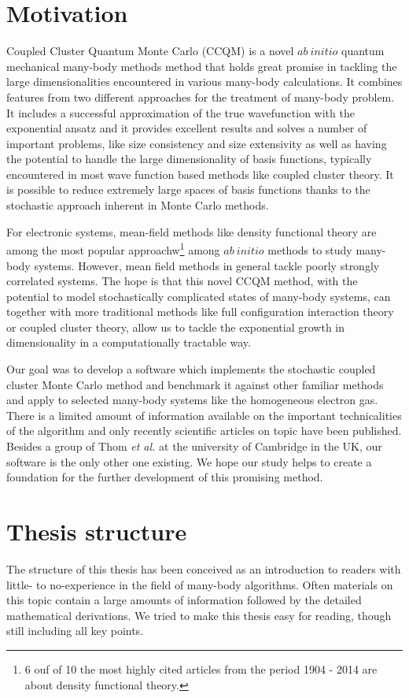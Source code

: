 \documentclass[twoside,english]{uiofysmaster}
\begin{document}
	\tableofcontents
	
\section{Motivation }
Coupled Cluster Quantum Monte Carlo (CCQM)  is a novel $ab\ initio$ quantum
mechanical many-body methods method that holds great promise in
tackling the large dimensionalities encountered in various many-body
calculations.  It combines features from two different approaches for
the treatment of many-body problem. It includes a successful
approximation of the true wavefunction with the exponential ansatz and it
provides excellent results and solves a number of important problems,
like size consistency and size extensivity as well as having the potential  to handle
the large dimensionality of basis functions, typically encountered in most wave function based methods like coupled cluster theory.
It is possible to reduce extremely large spaces of
basis functions thanks to the stochastic approach inherent  in Monte Carlo methods.

For electronic systems, mean-field methods like density functional
theory are among the most popular approachw\footnote{6 ouf of 10 the
	most highly cited articles from the period 1904 - 2014 are about
	density functional theory\cite{httpphysicsdatabasecom}.} among
$ab\ initio$ methods to study many-body systems. However, mean field
methods in general tackle poorly strongly correlated systems.  The
hope is that this novel CCQM method, with the potential to model
stochastically complicated states of many-body systems, can together
with more traditional methods like full configuration interaction
theory or coupled cluster theory, allow us to tackle the exponential
growth in dimensionality in a computationally tractable way.

Our goal was to develop a software which implements the stochastic
coupled cluster Monte Carlo method and benchmark it against other
familiar methods and apply to selected many-body systems like the
homogeneous electron gas. There is a limited amount of information
available on the important technicalities of the algorithm and only
recently scientific articles on topic have been published. Besides a
group of Thom {\em et al.} at the university of Cambridge in the UK, our software is the
only other one existing.  We hope our study helps to create a
foundation for the further development of this promising method.



\section{Thesis structure}
The structure of this thesis has been conceived as an introduction to
readers with little- to no-experience in the field of many-body
algorithms. Often materials on this topic contain a large amounts of
information followed by the detailed mathematical derivations. We
tried to make this thesis easy for reading, though still including all
key points.
\end{document}
